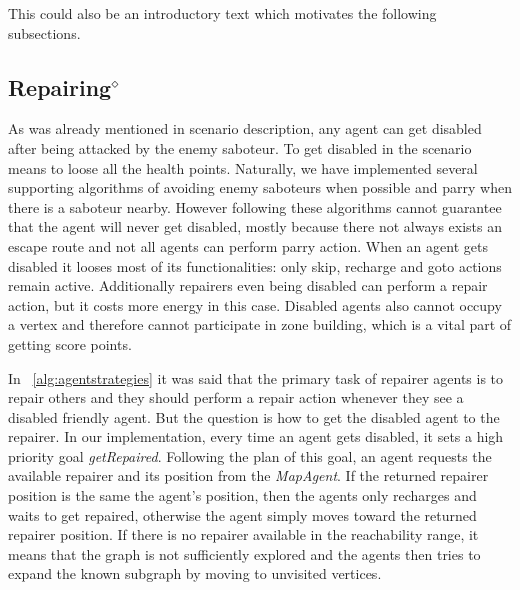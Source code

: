 This could also be an introductory text which motivates the following subsections.





\subsection[Repairing]{Repairing$^\diamond$}\label{alg:repairing}
As was already mentioned in scenario description, any agent can get disabled after being attacked by the enemy saboteur. To get disabled in the scenario means to loose all the health points. Naturally, we have implemented several supporting algorithms of avoiding enemy saboteurs when possible and parry when there is a saboteur nearby. However following these algorithms cannot guarantee that the agent will never get disabled, mostly because there not always exists an escape route and not all agents can perform parry action. When an agent gets disabled it looses most of its functionalities: only skip, recharge and goto actions remain active. Additionally repairers even being disabled can perform a repair action, but it costs more energy in this case. Disabled agents also cannot occupy a vertex and therefore cannot participate in zone building, which is a vital part of getting score points.

In ~\autoref{alg:agentstrategies} it was said that the primary task of repairer agents is to repair others and they should perform a repair action whenever they see a disabled friendly agent. But the question is how to get the disabled agent to the repairer. In our implementation, every time an agent gets disabled, it sets a high priority goal \emph{getRepaired}. Following the plan of this goal, an agent requests the available repairer and its position from the \emph{MapAgent}. If the returned repairer position is the same the agent's position, then the agents only recharges and waits to get repaired, otherwise the agent simply moves toward the returned repairer position. If there is no repairer available in the reachability range, it means that the graph is not sufficiently explored and the agents then tries to expand the known subgraph by moving to unvisited vertices.

